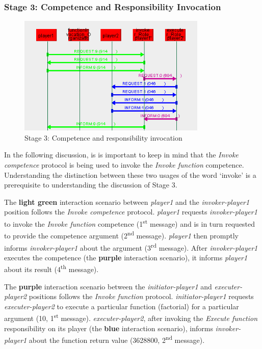 \subsubsection*{Stage 3: Competence and Responsibility Invocation}

\begin{figure}[H]
	\centering
	\includegraphics[width=0.8\textwidth]{images/examples/example1-stage3.png}
	\caption{Stage 3: Competence and responsibility invocation}
	\label{figure:example1-stage3}
\end{figure}

In the following discussion, is is important to keep in mind that the \textit{Invoke competence} protocol is being used to invoke the \textit{Invoke function} competence.
Understanding the distinction between these two usages of the word `invoke' is a prerequisite to understanding the discussion of Stage 3.

The \textbf{light green} interaction scenario between \textit{player1} and the \textit{invoker-player1} position follows the \textit{Invoke competence} protocol.
\textit{player1} requests \textit{invoker-player1} to invoke the \textit{Invoke function} competence (1\textsuperscript{st} message) and is in turn requested to provide the competence argument (2\textsuperscript{nd} message).
\textit{player1} then promptly informs \textit{invoker-player1} about the argument (3\textsuperscript{rd} message).
After \textit{invoker-player1} executes the competence (the \textbf{purple} interaction scenario), it informs \textit{player1} about its result (4\textsuperscript{th} message).

The \textbf{purple} interaction scenario between the \textit{initiator-player1} and \textit{executer-player2} positions follows the \textit{Invoke function} protocol.
\textit{initiator-player1} requests \textit{executer-player2} to execute a particular function (factorial) for a particular argument (10, 1\textsuperscript{st} message).
\textit{executer-player2}, after invoking the \textit{Execute function} responsibility on its player (the \textbf{blue} interaction scenario), informs \textit{invoker-player1} about the function return value (3628800, 2\textsuperscript{nd} message).

